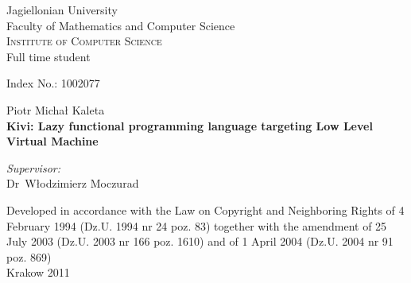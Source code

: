 \documentclass[12pt,a4paper]{report}
\begin{document}
\begin{titlepage}
\begin{center}

Jagiellonian University \\
Faculty of Mathematics and Computer Science \\
\textsc{\large Institute of Computer Science} \\
Full time student \\[3cm]

\begin{flushleft}
  \large
  Index No.: 1002077 \\[3cm]
\end{flushleft}
{\LARGE Piotr Micha\l{} Kaleta} \\[1cm]
{\huge \bf Kivi: Lazy functional programming language targeting Low Level Virtual Machine} \\[1.5cm]

\begin{flushright}
  \large
  \emph{Supervisor:} \\
  Dr~W\l{}odzimierz Moczurad
\end{flushright}


\vfill
{\footnotesize Developed in accordance with the Law on Copyright and Neighboring
Rights of 4 February 1994 (Dz.U. 1994 nr 24 poz. 83) together with the
amendment of 25 July 2003 (Dz.U. 2003 nr 166 poz. 1610) and of 1 April 2004
(Dz.U. 2004 nr 91 poz.  869)} \\[0.5cm]
{\Large Krakow 2011}

\end{center}
\end{titlepage}

\newpage
\thispagestyle{empty}
\mbox{}

\onehalfspace

\Huge
\begin{abstract}
  \normalsize
  \center
  This paper describes the design and implementation of a new lazy programming
  language called Kivi. It is based on the concept of \textit{G-machine}, an
  efficient implementation of graph reducer. Kivi's syntax resembles the one of
  Haskell, but beneath syntactic layer, it differs significantly. The code that
  Kivi generates, is the intermediate language of a compiler toolkit called
  \textit{Low Level Virtual Machine}\cite{website:llvm} or \textit{LLVM} for
  short. LLVM compiles and assembles the program into an executable. Programs
  written in Kivi are therefore likely to gain run-time speedup due to highly
  developed optimization mechanisms implemented in LLVM. Choosing LLVM as a
  backend makes it easier to port programs to different architectures as well.
  Kivi is meant to form the basis of a future implementation of a lazy language
  for concurrent programming, integrated with Erlang by means of its
  distribution protocols.
\end{abstract}
\end{document}
